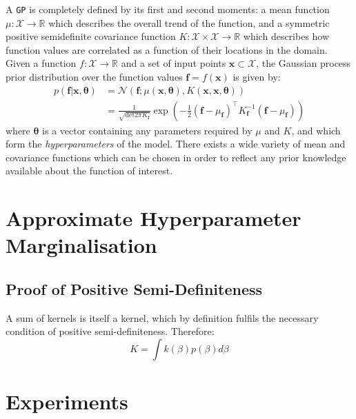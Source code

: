 \documentclass{article}
\begin{document}
A \verb"GP" is completely defined by its first and second moments: a mean function $\mu : \mathcal{X} \rightarrow \mathbb{R}$ which describes the overall trend of the function, and a symmetric positive semidefinite covariance function $K : \mathcal{X} \times \mathcal{X} \rightarrow \mathbb{R}$ which describes how function values are correlated as a function of their locations in the domain. Given a function $f : \mathcal{X} \rightarrow \mathbb{R}$ and a set of input points $\mathbf{x} \subset \mathcal{X}$, the Gaussian process prior distribution over the function values $\mathbf{f} = f(\mathbf{x})$ is given by:
\begin{align}
p(\mathbf{f} | \mathbf{x},\bm{\theta}) &= \mathcal{N}\left( \mathbf{f};\mu(\mathbf{x},\bm{\theta}),K(\mathbf{x},\mathbf{x},\bm{\theta}) \right) \\
&= \frac{1}{\sqrt{\mathrm{det} 2 \pi K_{\mathbf{f}}} } \exp \left( - \frac{1}{2} (\mathbf{f}-\mu_{\mathbf{f}})^\top K_\mathbf{f}^{-1} (\mathbf{f}-\mu_{\mathbf{f}})  \right)
\end{align}
where $\bm{\theta}$ is a vector containing any parameters required by $\mu$ and $K$, and which form the \emph{hyperparameters} of the model. There exists a wide variety of mean and covariance functions which can be chosen in order to reflect any prior knowledge available about the function of interest.









\section{Approximate Hyperparameter Marginalisation}

\subsection{Proof of Positive Semi-Definiteness}

A sum of kernels is itself a kernel, which by definition fulfils the necessary condition of positive semi-definiteness. Therefore:
\begin{equation}
K = \int k(\beta)p(\beta)d\beta
\end{equation}


\section{Experiments}
\end{document}
